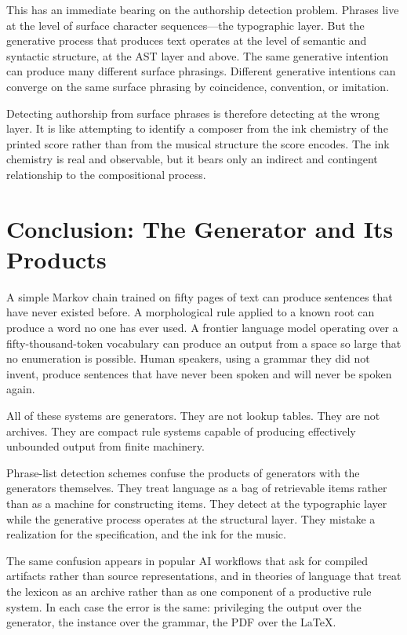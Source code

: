 \documentclass[12pt]{article}
\begin{document}
This has an immediate bearing on the authorship detection problem. Phrases live at the level of surface character sequences---the typographic layer. But the generative process that produces text operates at the level of semantic and syntactic structure, at the AST layer and above. The same generative intention can produce many different surface phrasings. Different generative intentions can converge on the same surface phrasing by coincidence, convention, or imitation.

Detecting authorship from surface phrases is therefore detecting at the wrong layer. It is like attempting to identify a composer from the ink chemistry of the printed score rather than from the musical structure the score encodes. The ink chemistry is real and observable, but it bears only an indirect and contingent relationship to the compositional process.

\section{Conclusion: The Generator and Its Products}

A simple Markov chain trained on fifty pages of text can produce sentences that have never existed before. A morphological rule applied to a known root can produce a word no one has ever used. A frontier language model operating over a fifty-thousand-token vocabulary can produce an output from a space so large that no enumeration is possible. Human speakers, using a grammar they did not invent, produce sentences that have never been spoken and will never be spoken again.

All of these systems are generators. They are not lookup tables. They are not archives. They are compact rule systems capable of producing effectively unbounded output from finite machinery.

Phrase-list detection schemes confuse the products of generators with the generators themselves. They treat language as a bag of retrievable items rather than as a machine for constructing items. They detect at the typographic layer while the generative process operates at the structural layer. They mistake a realization for the specification, and the ink for the music.

The same confusion appears in popular AI workflows that ask for compiled artifacts rather than source representations, and in theories of language that treat the lexicon as an archive rather than as one component of a productive rule system. In each case the error is the same: privileging the output over the generator, the instance over the grammar, the PDF over the \LaTeX.
\end{document}
